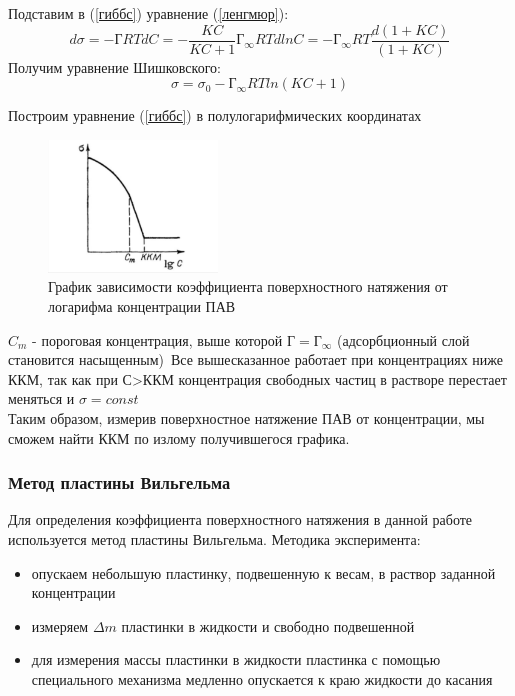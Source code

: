 \documentclass[a4paper,12pt]{article}
\begin{document}
Подставим в (\ref{гиббс}) уравнение (\ref{ленгмюр}):
\begin{equation*}
    d\sigma = -\text{Г} R T dC = -\frac{KC}{KC + 1} \text{Г}_{\infty} R T dlnC = -\text{Г}_{\infty}RT\frac{d(1 + KC)}{(1 + KC)}
\end{equation*}
Получим уравнение Шишковского:
\begin{equation}
    \sigma = \sigma_{0} - \text{Г}_{\infty}RTln(KC + 1)
\end{equation}

Построим уравнение (\ref{гиббс}) в полулогарифмических координатах

\begin{figure}[h!]
    \centering
    \includegraphics[width = 0.4\textwidth]{natyazh.png}
    \caption{График зависимости коэффициента поверхностного натяжения от логарифма концентрации ПАВ}
    \label{fig:теорln}
\end{figure}

$C_{m}$ - пороговая концентрация, выше которой $\text{Г} = \text{Г}_{\infty}$ (адсорбционный слой становится насыщенным)\ 
Все вышесказанное работает при концентрациях ниже ККМ, так как при С>ККМ концентрация свободных частиц в растворе перестает меняться и $\sigma = const$ \\
Таким образом, измерив поверхностное натяжение ПАВ от концентрации, мы сможем найти ККМ по излому получившегося графика.
\subsubsection{Метод пластины Вильгельма}
 Для определения коэффициента поверхностного натяжения в данной работе используется метод пластины Вильгельма. Методика эксперимента:
\begin{itemize}
    \item опускаем небольшую пластинку, подвешенную к весам, в раствор заданной концентрации
    \item измеряем $\Delta m $ пластинки в жидкости и свободно подвешенной
    \item для измерения массы пластинки в жидкости пластинка с помощью специального механизма медленно опускается к краю жидкости до касания 
\end{itemize}
\end{document}

